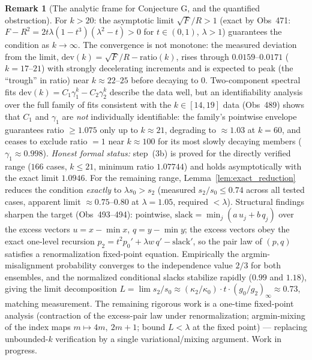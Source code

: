 \documentclass[11pt]{article}
\theoremstyle{definition}
\newtheorem{remark}[theorem]{Remark}
\begin{document}
\begin{remark}[The analytic frame for Conjecture G, and the quantified
obstruction]
For $k>20$: the asymptotic limit $\sqrt{F}/R>1$ (exact by Obs~471: $F-R^2 = 2t\lambda(1-t^3)(\lambda^2-t)>0$
for $t\in(0,1)$, $\lambda>1$) guarantees the condition as $k\to\infty$.
The convergence is not monotone: the measured deviation from the limit,
$\mathrm{dev}(k)=\sqrt{F}/R-\mathrm{ratio}(k)$, rises through
$0.0159$--$0.0171$ ($k=17$--$21$) with strongly decelerating increments and is expected
to peak (the ``trough'' in ratio) near $k\approx 22$--$25$ before decaying to $0$.
Two-component spectral fits $\mathrm{dev}(k)= C_1\gamma_1^k - C_2\gamma_2^k$ describe the
data well, but an identifiability analysis over the full family of fits consistent with the
$k\in[14,19]$ data (Obs~489) shows that $C_1$ and $\gamma_1$ are \emph{not} individually
identifiable: the family's pointwise envelope guarantees ratio $\ge 1.075$ only up to
$k\approx 21$, degrading to $\approx 1.03$ at $k=60$, and ceases to exclude ratio $=1$
near $k\approx 100$ for its most slowly decaying members ($\gamma_1\approx 0.998$).
\emph{Honest formal status:} step~(3b) is proved for the directly verified range
($166$ cases, $k\le 21$, minimum ratio $1.07744$) and holds asymptotically with the exact
limit $1.0946$. For the remaining range, Lemma~\ref{lem:exact_reduction} reduces the
condition \emph{exactly} to $\lambda s_0 > s_2$ (measured $s_2/s_0\le 0.74$ across all
tested cases, apparent limit $\approx 0.75$--$0.80$ at $\lambda=1.05$, required $<\lambda$).
Structural findings sharpen the target (Obs~493--494): pointwise,
$\mathrm{slack}=\min_j(a\,u_j+b\,q_j)$ over the excess vectors $u=x-\min x$, $q=y-\min y$;
the excess vectors obey the exact one-level recursion
$p_2 = t^2 p_0' + \lambda w\, q' - \mathrm{slack}'$, so the pair law of $(p,q)$ satisfies a
renormalization fixed-point equation. Empirically the argmin-misalignment probability
converges to the independence value $2/3$ for both ensembles, and the normalized
conditional slacks stabilize rapidly ($0.99$ and $1.18$), giving the limit decomposition
$L=\lim s_2/s_0 \approx (\kappa_2/\kappa_0)\cdot t\cdot (g_0/g_2)_\infty \approx 0.73$,
matching measurement. The remaining rigorous work is a one-time fixed-point analysis
(contraction of the excess-pair law under renormalization; argmin-mixing of the index maps
$m\mapsto 4m,\ 2m{+}1$; bound $L<\lambda$ at the fixed point) — replacing unbounded-$k$
verification by a single variational/mixing argument. Work in progress.


\end{remark}
\end{document}

